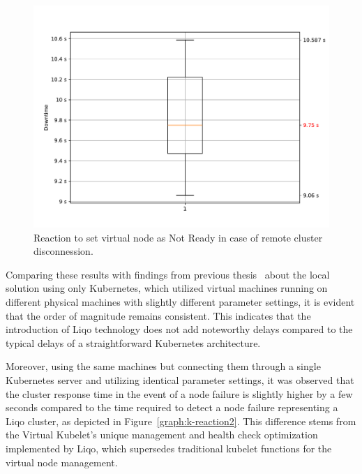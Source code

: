 \begin{figure}[ht]\centering
\includegraphics[scale=0.5]{Pictures/k3s-reaction}
\caption{Reaction to set virtual node as Not Ready in case of remote cluster disconnession.}\label{graph:k-reaction}
\end{figure}

Comparing these results with findings from previous thesis~\cite{e3-1} about the local solution using only Kubernetes, which utilized virtual machines running on different physical machines with slightly different parameter settings, it is evident that the order of magnitude remains consistent. This indicates that the introduction of Liqo technology does not add noteworthy delays compared to the typical delays of a straightforward Kubernetes architecture.


Moreover, using the same machines but connecting them through a single Kubernetes server and utilizing identical parameter settings, it was observed that the cluster response time in the event of a node failure is slightly higher by a few seconds compared to the time required to detect a node failure representing a Liqo cluster, as depicted in Figure~\ref{graph:k-reaction2}. This difference stems from the Virtual Kubelet's unique management and health check optimization implemented by Liqo, which supersedes traditional kubelet functions for the virtual node management.

